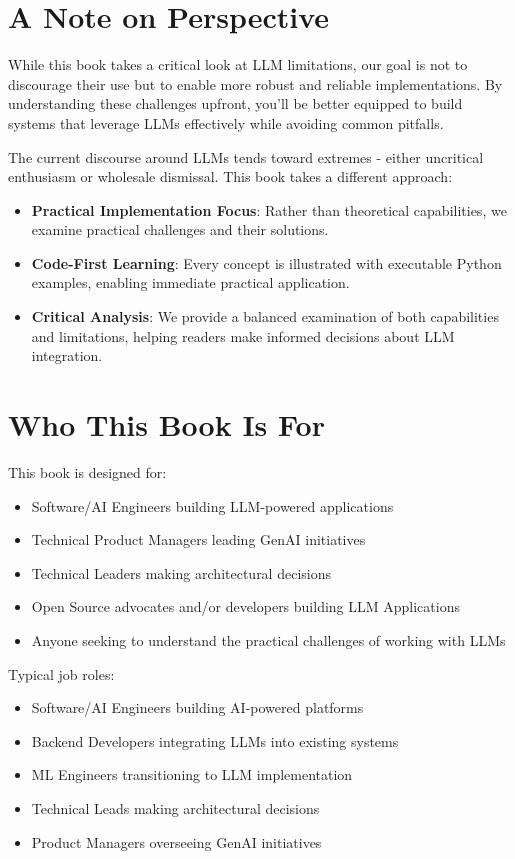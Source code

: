 \section{A Note on Perspective}

While this book takes a critical look at LLM limitations, our goal is not to discourage their use but to enable more robust and reliable implementations. By understanding these challenges upfront, you'll be better equipped to build systems that leverage LLMs effectively while avoiding common pitfalls.

The current discourse around LLMs tends toward extremes - either uncritical enthusiasm or wholesale dismissal. This book takes a different approach:

\begin{itemize}
\item \textbf{Practical Implementation Focus}: Rather than theoretical capabilities, we examine practical challenges and their solutions.
\item \textbf{Code-First Learning}: Every concept is illustrated with executable Python examples, enabling immediate practical application.
\item \textbf{Critical Analysis}: We provide a balanced examination of both capabilities and limitations, helping readers make informed decisions about LLM integration.
\end{itemize}

\section{Who This Book Is For}

This book is designed for:

\begin{itemize}
\item Software/AI Engineers building LLM-powered applications 
\item Technical Product Managers leading GenAI initiatives 
\item Technical Leaders making architectural decisions
\item Open Source advocates and/or developers building LLM Applications 
\item Anyone seeking to understand the practical challenges of working with LLMs 
\end{itemize}

Typical job roles:

\begin{itemize}
\item Software/AI Engineers building AI-powered platforms
\item Backend Developers integrating LLMs into existing systems
\item ML Engineers transitioning to LLM implementation
\item Technical Leads making architectural decisions
\item Product Managers overseeing GenAI initiatives
\end{itemize}

